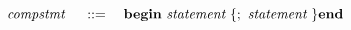 \[
	~\emph{compstmt}~ \quad ::= \quad
		\textbf{begin} ~\emph{statement}~ \{; ~\emph{statement}~ \} \textbf{end}
\]